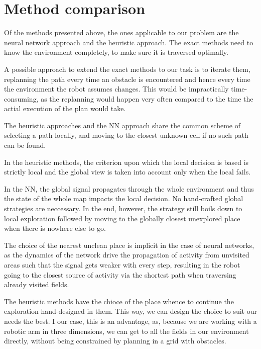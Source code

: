 \documentclass[buriama8_dp.tex]{subfiles}
\begin{document}
\section{Method comparison}
\label{sec:cpp_comp}

Of the methods presented above, the ones applicable to our problem are the neural network approach and the heuristic approach. The exact methods need to know the environment completely, to make sure it is traversed optimally.

A possible approach to extend the exact methods to our task is to iterate them, replanning the path every time an obstacle is encountered and hence every time the environment the robot assumes changes. This would be impractically time-consuming, as the replanning would happen very often compared to the time the actial execution of the plan would take.

The heuristic approaches and the NN approach share the common scheme of selecting a path locally, and moving to the closest unknown cell if no such path can be found. 

In the heuristic methods, the criterion upon which the local decision is based is strictly local and the global view is taken into account only when the local fails.

In the NN, the global signal propagates through the whole environment and thus the state of the whole map impacts the local decision. No hand-crafted global strategies are neccessary. In the end, however, the strategy still boils down to local exploration followed by moving to the globally closest unexplored place when there is nowhere else to go.

The choice of the nearest unclean place is implicit  in the case of neural networks, as the dynamics of the network drive the propagation of activity from unvisited areas such that the signal gets weaker with every step, resulting in the robot going to the closest source of activity via the shortest path when traversing already visited fields.

The heuristic methods have the chioce of the place whence to continue the exploration hand-designed in them. This way, we can design the choice to suit our needs the best.  I our case, this is an advantage, as, because we are working with a robotic arm in three dimensions, we can get to all the fields in our environment directly, without being constrained by planning in a grid with obstacles.
\end{document}
